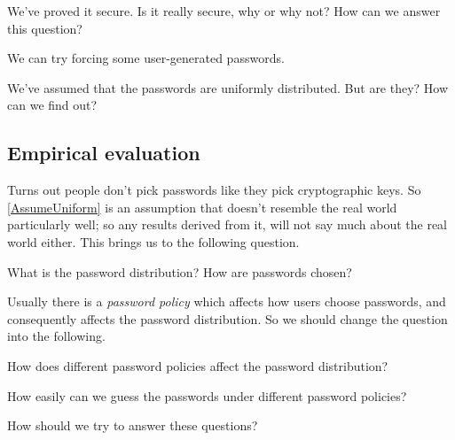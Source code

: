 \begin{frame}
  \begin{exercise}
    We've proved it secure.
    Is it really secure, why or why not?
    How can we answer this question?
  \end{exercise}

  \begin{solution}
    We can try forcing some user-generated passwords.

    We've assumed that the passwords are uniformly distributed.
    But are they?
    How can we find out?
  \end{solution}
\end{frame}

\subsection{Empirical evaluation}

Turns out people don't pick passwords like they pick cryptographic keys.
So \cref{AssumeUniform} is an assumption that doesn't resemble the real world 
particularly well; so any results derived from it, will not say much about the 
real world either.
This brings us to the following question.

\begin{frame}
\begin{question}\label{PasswordDistribution}
  What is the password distribution?
  How are passwords chosen?
\end{question}
\end{frame}

Usually there is a \emph{password policy} which affects how users choose 
passwords, and consequently affects the password distribution.
So we should change the question into the following.

\begin{frame}
\begin{question}
  How does different password policies affect the password distribution?
\end{question}
\begin{question}\label{Guessability}
  How easily can we guess the passwords under different password policies?
\end{question}
\begin{exercise}
  How should we try to answer these questions?
\end{exercise}
\end{frame}


